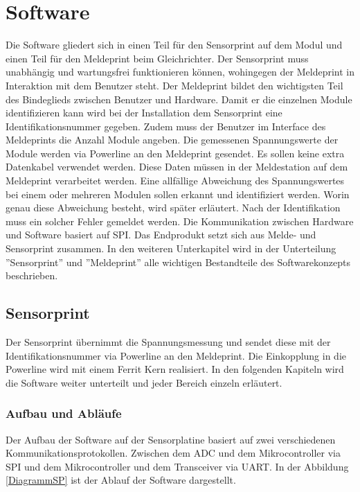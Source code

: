 \section{Software}
Die Software gliedert sich in einen Teil für den Sensorprint auf dem Modul und einen Teil für den Meldeprint beim Gleichrichter. Der Sensorprint muss unabhängig und wartungsfrei funktionieren können, wohingegen der Meldeprint in Interaktion mit dem Benutzer steht. Der Meldeprint bildet den wichtigsten Teil des Bindeglieds zwischen Benutzer und Hardware. Damit er die einzelnen Module identifizieren kann wird bei der Installation dem Sensorprint eine Identifikationsnummer gegeben. Zudem muss der Benutzer im Interface des Meldeprints die Anzahl Module angeben.
Die gemessenen Spannungswerte der Module werden via Powerline an den Meldeprint gesendet. Es sollen keine extra Datenkabel verwendet werden. Diese Daten müssen in der Meldestation auf dem Meldeprint verarbeitet werden. Eine allfällige Abweichung des Spannungswertes bei einem oder mehreren Modulen sollen erkannt und identifiziert werden. Worin genau diese Abweichung besteht, wird später erläutert. Nach der Identifikation muss ein solcher Fehler gemeldet werden. Die Kommunikation zwischen Hardware und Software basiert auf SPI. Das Endprodukt setzt sich aus Melde- und Sensorprint zusammen. In den weiteren Unterkapitel wird in der Unterteilung ''Sensorprint'' und ''Meldeprint'' alle wichtigen Bestandteile des Softwarekonzepts beschrieben.
\newpage
\subsection{Sensorprint}\label{Software_sensorprint}
Der Sensorprint übernimmt die Spannungsmessung und sendet diese mit der Identifikationsnummer via Powerline an den Meldeprint. Die Einkopplung in die Powerline wird mit einem Ferrit Kern realisiert. In den folgenden Kapiteln wird die Software weiter unterteilt und jeder Bereich einzeln erläutert.
\subsubsection{Aufbau und Abläufe}
Der Aufbau der Software auf der Sensorplatine basiert auf zwei verschiedenen Kommunikationsprotokollen. Zwischen dem ADC und dem Mikrocontroller via SPI und dem Mikrocontroller und dem Transceiver via UART. In der Abbildung \ref{DiagrammSP} ist der Ablauf der Software dargestellt.

